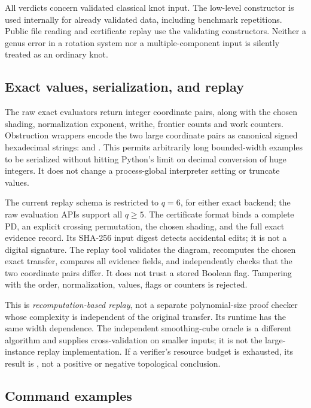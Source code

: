 All verdicts concern validated classical knot input. The low-level
 constructor is used internally for already validated
data, including benchmark repetitions. Public file reading and certificate
replay use the validating constructors. Neither a genus error in a rotation
system nor a multiple-component input is silently treated as an ordinary
knot.

\subsection{Exact values, serialization, and replay}

The raw exact evaluators return integer coordinate pairs, along with the
chosen shading, normalization exponent, writhe, frontier counts and work
counters. Obstruction wrappers encode the two large coordinate pairs as
canonical signed hexadecimal strings:
 and .
This permits arbitrarily long bounded-width examples to be serialized
without hitting Python's limit on decimal conversion of huge integers.
It does not change a process-global interpreter setting or truncate values.

The current replay schema is restricted to $q=6$, for either exact backend;
the raw evaluation APIs support all $q\ge5$.
The certificate format binds a complete PD, an explicit crossing permutation,
the chosen shading, and the full exact evidence record. Its SHA-256 input
digest detects accidental edits; it is not a digital signature.
The replay tool validates the diagram, recomputes the chosen exact transfer,
compares all evidence fields, and independently checks that the two
coordinate pairs differ. It does not trust a stored Boolean flag.
Tampering with the order, normalization, values, flags or counters is
rejected.

This is \emph{recomputation-based replay}, not a separate polynomial-size
proof checker whose complexity is independent of the original transfer.
Its runtime has the same width dependence. The independent smoothing-cube
oracle is a different algorithm and supplies cross-validation on smaller
inputs; it is not the large-instance replay implementation.
If a verifier's resource budget is exhausted, its result is
, not a positive or negative topological conclusion.

\subsection{Command examples}


